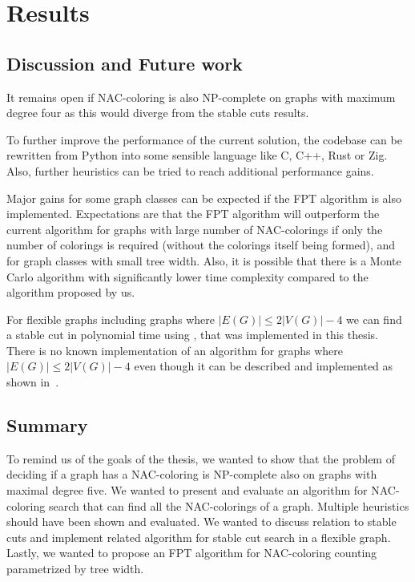 
\chapter{Results}

\section{Discussion and Future work}

It remains open if NAC-coloring is also NP-complete on graphs with
maximum degree four as this would diverge from the stable cuts results.

To further improve the performance of the current solution, the codebase
can be rewritten from Python into some sensible language like C, C++, Rust or Zig.
Also, further heuristics can be tried to reach additional performance gains.

Major gains for some graph classes
can be expected if the FPT algorithm is also implemented.
Expectations are that the FPT algorithm will outperform the current algorithm
for graphs with large number of NAC-colorings if only the number of colorings
is required (without the colorings itself being formed), and
for graph classes with small tree width.
Also, it is possible that there is a Monte Carlo algorithm with significantly
lower time complexity compared to the algorithm proposed by us.

For flexible graphs including graphs where \( |E(G)| \le 2|V(G)| - 4 \)
we can find a stable cut in polynomial time using ,
that was implemented in this thesis.
There is no known implementation of an algorithm
for graphs where \( |E(G)| \le 2|V(G)| - 4 \)
even though it can be described and implemented
as shown in~\cite{stable_cuts_2v_3,stable_cuts_2v_3_revisit}.

\section{Summary}

To remind us of the goals of the thesis,
we wanted to show that the problem of deciding if a graph has a NAC-coloring
is NP-complete also on graphs with maximal degree five.
We wanted to present and evaluate an algorithm for NAC-coloring search
that can find all the NAC-colorings of a graph.
Multiple heuristics should have been shown and evaluated.
We wanted to discuss relation to stable cuts and implement related algorithm
for stable cut search in a flexible graph.
Lastly, we wanted to propose an FPT algorithm for NAC-coloring counting
parametrized by tree width.

